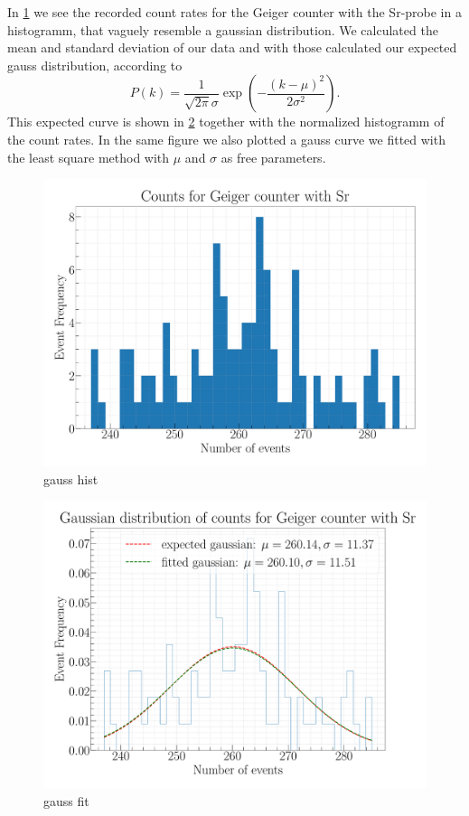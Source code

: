 In \cref{fig:GaussHist} we see the recorded count rates for the Geiger counter with the Sr-probe in a histogramm, that vaguely resemble a gaussian distribution. We calculated the mean and standard deviation of our data and with those calculated our expected gauss distribution, according to
\begin{equation}
P(k) = \frac{1}{\sqrt{2\pi}\sigma} \exp(-\frac{(k-\mu)^2}{2\sigma^2}).
\end{equation}
This expected curve is shown in \cref{fig:GaussFit} together with the normalized histogramm of the count rates. In the same figure we also plotted a gauss curve we fitted with the least square method with $\mu$ and $\sigma$ as free parameters.

\begin{figure}[H]
\centering
\includegraphics[width=\textwidth]{../Figures/Geiger_gauss_histogram.pdf}
\caption{gauss hist}
\label{fig:GaussHist}
\end{figure}

\begin{figure}[H]
\centering
\includegraphics[width=\textwidth]{../Figures/Geiger_gauss_fit.pdf}
\caption{gauss fit}
\label{fig:GaussFit}
\end{figure}

